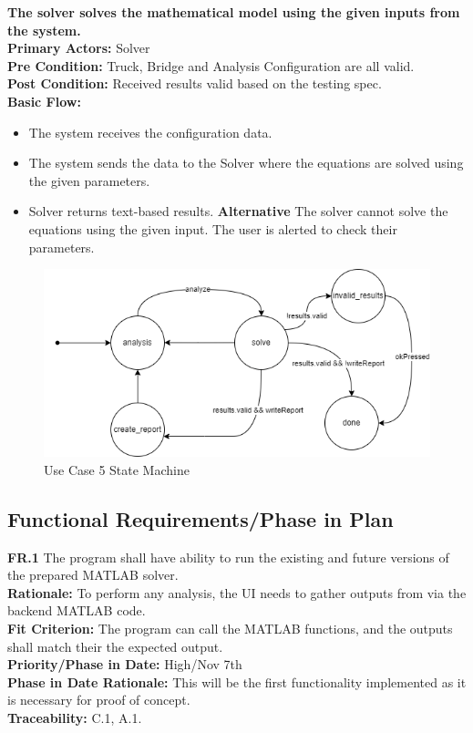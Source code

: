 \documentclass[12pt]{article}
\begin{document}
\noindent
\textbf{The solver solves the mathematical model using the given inputs from the system.} \\
\textbf{  Primary Actors:} Solver\\
\textbf{  Pre Condition:} Truck, Bridge and Analysis Configuration are all valid.\\
\textbf{  Post Condition:} Received results valid based on the testing spec.\\ 
\textbf{  Basic Flow:} 
\begin{itemize}
\item The system receives the configuration data. 
\item The system sends the data to the Solver where the equations are solved using the given parameters. 
\item Solver returns text-based results. 
\subitem \textbf{Alternative} The solver cannot solve the equations using the given input. The user is alerted to check their parameters. 
\end{itemize}
\begin{figure}[H]
  \centering
  \includegraphics[width=0.5\linewidth]{use-case-5-sm.png}
  \caption{Use Case 5 State Machine}
  \label {fig:use-case-5-sm}
\end{figure}

\subsection{Functional Requirements/Phase in Plan}
  \textbf{FR.1} The program shall have ability to run the existing and future versions of the prepared MATLAB solver.\\
  \textbf{Rationale:} To perform any analysis, the UI needs to gather outputs from via the backend MATLAB code.\\
  \textbf{Fit Criterion:} The program can call the MATLAB functions, and the outputs shall match their the expected output.\\
  \textbf{Priority/Phase in Date:} High/Nov 7th\\
  \textbf{Phase in Date Rationale:} This will be the first functionality implemented as it is necessary for proof of concept.\\
  \textbf{Traceability:} C.1, A.1.\\\\
  
\end{document}
